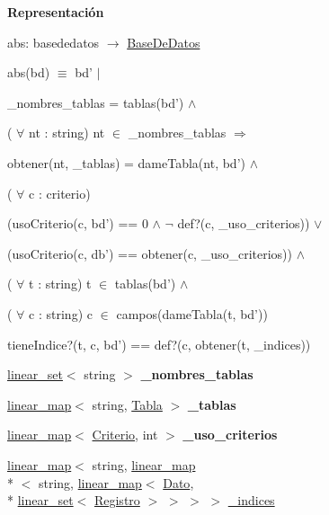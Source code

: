 \begin{Indent}{\bf Representación}
{abs\-: basededatos $\to$ \hyperlink{classBaseDeDatos}{Base\-De\-Datos}\par
abs(bd) $\equiv$ bd' $|$
\begin{DoxyItemize}
\item \-\_\-nombres\-\_\-tablas = tablas(bd') $\land$
\item ( $\forall$ nt \-: string) nt $\in$ \-\_\-nombres\-\_\-tablas $\Rightarrow$
\begin{DoxyItemize}
\item obtener(nt, \-\_\-tablas) = dame\-Tabla(nt, bd') $\land$
\end{DoxyItemize}
\item ( $\forall$ c \-: criterio)
\begin{DoxyItemize}
\item (uso\-Criterio(c, bd') == 0 $\land$ $\lnot$ def?(c, \-\_\-uso\-\_\-criterios)) $\lor$
\item (uso\-Criterio(c, db') == obtener(c, \-\_\-uso\-\_\-criterios)) $\land$
\end{DoxyItemize}
\item ( $\forall$ t \-: string) t $\in$ tablas(bd') $\land$
\item ( $\forall$ c \-: string) c $\in$ campos(dame\-Tabla(t, bd'))
\begin{DoxyItemize}
\item tiene\-Indice?(t, c, bd') == def?(c, obtener(t, \-\_\-indices)) 
\end{DoxyItemize}
\end{DoxyItemize}}\begin{DoxyCompactItemize}
\item 
\hypertarget{classBaseDeDatos_ae93f3d0a8d138e5742c52b9f2294d2bd}{\hyperlink{classlinear__set}{linear\-\_\-set}$<$ string $>$ {\bfseries \-\_\-nombres\-\_\-tablas}}\label{classBaseDeDatos_ae93f3d0a8d138e5742c52b9f2294d2bd}

\item 
\hypertarget{classBaseDeDatos_abc71fb94bf17d92df678705224cfd9b0}{\hyperlink{classlinear__map}{linear\-\_\-map}$<$ string, \hyperlink{classTabla}{Tabla} $>$ {\bfseries \-\_\-tablas}}\label{classBaseDeDatos_abc71fb94bf17d92df678705224cfd9b0}

\item 
\hypertarget{classBaseDeDatos_acc03ee648f19ad950d399861cc263a30}{\hyperlink{classlinear__map}{linear\-\_\-map}$<$ \hyperlink{classBaseDeDatos_a6742a222e87623bc92a810a693fb337b}{Criterio}, int $>$ {\bfseries \-\_\-uso\-\_\-criterios}}\label{classBaseDeDatos_acc03ee648f19ad950d399861cc263a30}

\item 
\hyperlink{classlinear__map}{linear\-\_\-map}$<$ string, \hyperlink{classlinear__map}{linear\-\_\-map}\\*
$<$ string, \hyperlink{classlinear__map}{linear\-\_\-map}$<$ \hyperlink{classDato}{Dato}, \\*
\hyperlink{classlinear__set}{linear\-\_\-set}$<$ \hyperlink{classRegistro}{Registro} $>$ $>$ $>$ $>$ \hyperlink{classBaseDeDatos_ac86d59c462ea3bef3aca9fc19d26bda1}{\-\_\-indices}
\end{DoxyCompactItemize}
\end{Indent}


